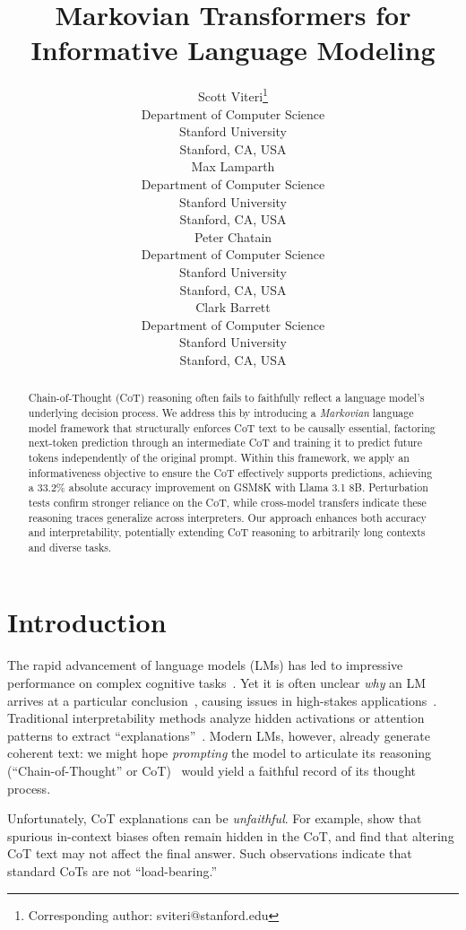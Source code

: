 \documentclass{article}
\title{Markovian Transformers for Informative Language Modeling}
\author{%
  Scott Viteri\thanks{Corresponding author: sviteri@stanford.edu} \\
  Department of Computer Science\\
  Stanford University\\
  Stanford, CA, USA \\
  \And
  Max Lamparth \\
  Department of Computer Science\\
  Stanford University\\
  Stanford, CA, USA \\
  \And
  Peter Chatain \\
  Department of Computer Science\\
  Stanford University\\
  Stanford, CA, USA \\
  \And
  Clark Barrett \\
  Department of Computer Science\\
  Stanford University\\
  Stanford, CA, USA \\
}
\begin{document}
\maketitle


\begin{abstract}
  Chain-of-Thought (CoT) reasoning often fails to faithfully reflect a language model's underlying decision process. We address this by introducing a \emph{Markovian} language model framework that structurally enforces CoT text to be causally essential, factoring next-token prediction through an intermediate CoT and training it to predict future tokens independently of the original prompt. Within this framework, we apply an informativeness objective to ensure the CoT effectively supports predictions, achieving a 33.2\% absolute accuracy improvement on GSM8K with Llama 3.1 8B. Perturbation tests confirm stronger reliance on the CoT, while cross-model transfers indicate these reasoning traces generalize across interpreters. Our approach enhances both accuracy and interpretability, potentially extending CoT reasoning to arbitrarily long contexts and diverse tasks.
\end{abstract}


\section{Introduction}
\label{sec:intro}
The rapid advancement of language models (LMs) has led to impressive performance on complex cognitive tasks~\citep{NEURIPS2020_1457c0d6}. Yet it is often unclear \emph{why} an LM arrives at a particular conclusion~\citep{lamparth2023analyzing,burns2024discovering,gurnee2024language}, causing issues in high-stakes applications~\citep{Grabb2024.04.07.24305462,lamparth2024human,rivera2024escalation}. Traditional interpretability methods analyze hidden activations or attention patterns to extract ``explanations''~\citep{geiger2022inducing,geva2022transformer,meng2022locating,raukur2022toward,wang2022interpretability,lamparth2023analyzing,nanda2023progress}. Modern LMs, however, already generate coherent text: we might hope \emph{prompting} the model to articulate its reasoning (``Chain-of-Thought'' or CoT)~\citep{nye2022show,wei2022chain} would yield a faithful record of its thought process. 

Unfortunately, CoT explanations can be \emph{unfaithful}. For example, \citet{turpin2023language} show that spurious in-context biases often remain hidden in the CoT, and \citet{lanham2023measuring} find that altering CoT text may not affect the final answer. Such observations indicate that standard CoTs are not ``load-bearing.''
\end{document}
